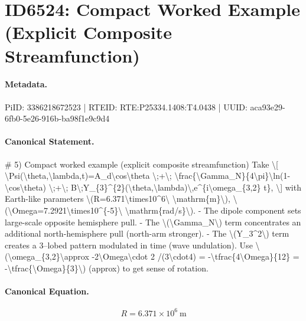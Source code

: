 \section*{ID6524: Compact Worked Example (Explicit Composite Streamfunction)}
\paragraph{Metadata.}
PiID: 3386218672523 | RTEID: RTE:P25334.1408:T4.0438 | UUID: aca93e29-6fb0-5e26-916b-ba98f1e9c9d4

\paragraph{Canonical Statement.}
\# 5) Compact worked example (explicit composite streamfunction) Take \textbackslash{}[ \textbackslash{}Psi(\textbackslash{}theta,\textbackslash{}lambda,t)=A\_d\textbackslash{}cos\textbackslash{}theta \textbackslash{};+\textbackslash{}; \textbackslash{}frac\{\textbackslash{}Gamma\_N\}\{4\textbackslash{}pi\}\textbackslash{}ln(1-\textbackslash{}cos\textbackslash{}theta) \textbackslash{};+\textbackslash{}; B\textbackslash{};Y\_\{3\}\textasciicircum{}\{2\}(\textbackslash{}theta,\textbackslash{}lambda)\textbackslash{},e\textasciicircum{}\{i\textbackslash{}omega\_\{3,2\} t\}, \textbackslash{}] with Earth-like parameters \textbackslash{}(R=6.371\textbackslash{}times10\textasciicircum{}6\textbackslash{} \textbackslash{}mathrm\{m\}\textbackslash{}), \textbackslash{}(\textbackslash{}Omega=7.2921\textbackslash{}times10\textasciicircum{}\{-5\}\textbackslash{} \textbackslash{}mathrm\{rad/s\}\textbackslash{}). - The dipole component sets large-scale opposite hemisphere pull. - The \textbackslash{}(\textbackslash{}Gamma\_N\textbackslash{}) term concentrates an additional north-hemisphere pull (north-arm stronger). - The \textbackslash{}(Y\_3\textasciicircum{}2\textbackslash{}) term creates a 3–lobed pattern modulated in time (wave undulation). Use \textbackslash{}(\textbackslash{}omega\_\{3,2\}\textbackslash{}approx -2\textbackslash{}Omega\textbackslash{}cdot 2 /(3\textbackslash{}cdot4) = -\textbackslash{}tfrac\{4\textbackslash{}Omega\}\{12\} = -\textbackslash{}tfrac\{\textbackslash{}Omega\}\{3\}\textbackslash{}) (approx) to get sense of rotation.

\paragraph{Canonical Equation.}
\[
R=6.371\times10^6\ \mathrm{m}
\]

